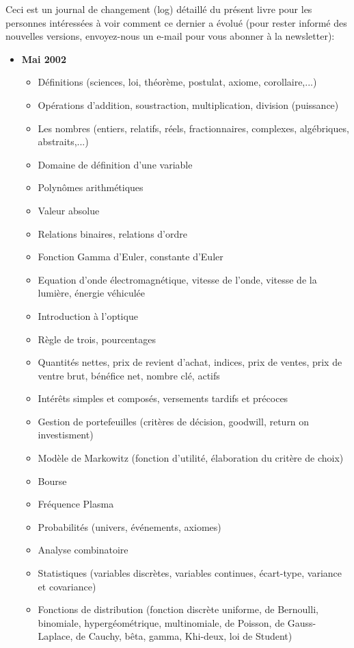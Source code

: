 \documentclass[12pt,a4paper,twoside,openright]{report}
\theoremstyle{definition}
\theoremstyle{itexmp}
\numberwithin{equation}{section}
\begin{document}
Ceci est un journal de changement (log) détaillé du présent livre pour les personnes intéressées à voir comment ce dernier a évolué (pour rester informé des nouvelles versions, envoyez-nous un e-mail pour vous abonner à la newsletter):
	\begin{itemize}
		\item \textbf{Mai 2002}
		\begin{itemize}[noitemsep]
			\item Définitions (sciences, loi, théorème, postulat, axiome, corollaire,...)
			\item Opérations d'addition, soustraction, multiplication, division (puissance)
			\item Les nombres (entiers, relatifs, réels, fractionnaires, complexes, algébriques, abstraits,...)
			\item Domaine de définition d'une variable
			\item Polynômes arithmétiques
			\item Valeur absolue
			\item Relations binaires, relations d'ordre
			\item Fonction Gamma d'Euler, constante d'Euler
			\item Equation d'onde électromagnétique, vitesse de l'onde, vitesse de la lumière, énergie véhiculée
			\item Introduction à l'optique
			\item Règle de trois, pourcentages
			\item Quantités nettes, prix de revient d'achat, indices, prix de ventes, prix de ventre brut, bénéfice net, nombre clé, actifs
			\item Intérêts simples et composés, versements tardifs et précoces
			\item Gestion de portefeuilles (critères de décision, goodwill, return on investisment)
			\item Modèle de Markowitz (fonction d'utilité, élaboration du critère de choix)
			\item Bourse
			\item Fréquence Plasma
			\item Probabilités (univers, événements, axiomes)
			\item Analyse combinatoire 
			\item Statistiques (variables discrètes, variables continues, écart-type, variance et covariance)
			\item Fonctions de distribution (fonction discrète uniforme, de Bernoulli, binomiale, hypergéométrique, multinomiale, de Poisson, de Gauss-Laplace, de Cauchy, bêta, gamma, Khi-deux, loi de Student)

\end{itemize}
\end{itemize}
\end{document}
